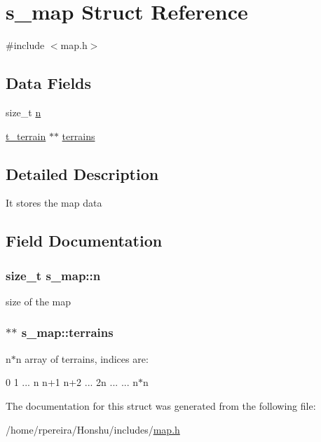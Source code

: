 \hypertarget{structs__map}{}\section{s\+\_\+map Struct Reference}
\label{structs__map}


{\ttfamily \#include $<$map.\+h$>$}

\subsection*{Data Fields}
\begin{DoxyCompactItemize}
\item 
size\+\_\+t \hyperlink{structs__map_a3f194916091f71193cb3dad4cf9e4db8}{n}
\item 
\hyperlink{structs__terrain}{t\+\_\+terrain} $\ast$$\ast$ \hyperlink{structs__map_afea33046e86fdcaf41c6689925e4ccda}{terrains}
\end{DoxyCompactItemize}


\subsection{Detailed Description}
It stores the map data 

\subsection{Field Documentation}
\subsubsection[{\texorpdfstring{n}{n}}]{\setlength{\rightskip}{0pt plus 5cm}size\+\_\+t s\+\_\+map\+::n}\hypertarget{structs__map_a3f194916091f71193cb3dad4cf9e4db8}{}\label{structs__map_a3f194916091f71193cb3dad4cf9e4db8}
size of the map 
\subsubsection[{\texorpdfstring{terrains}{terrains}}]{$\ast$$\ast$ s\+\_\+map\+::terrains}\hypertarget{structs__map_afea33046e86fdcaf41c6689925e4ccda}{}\label{structs__map_afea33046e86fdcaf41c6689925e4ccda}
n$\ast$n array of terrains, indices are\+:

0 1 ... n n+1 n+2 ... 2n ... ... n$\ast$n 

The documentation for this struct was generated from the following file\+:\begin{DoxyCompactItemize}
\item 
/home/rpereira/\+Honshu/includes/\hyperlink{map_8h}{map.\+h}\end{DoxyCompactItemize}
